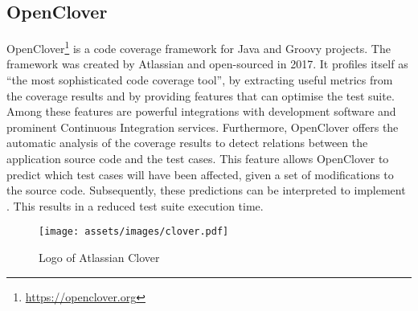 
\subsection{OpenClover}
OpenClover\footnote{\url{https://openclover.org}} is a code coverage framework for Java and Groovy projects. The framework was created by Atlassian and open-sourced in 2017. It profiles itself as ``the most sophisticated code coverage tool'', by extracting useful metrics from the coverage results and by providing features that can optimise the test suite. Among these features are powerful integrations with development software and prominent Continuous Integration services. Furthermore, OpenClover offers the automatic analysis of the coverage results to detect relations between the application source code and the test cases. This feature allows OpenClover to predict which test cases will have been affected, given a set of modifications to the source code. Subsequently, these predictions can be interpreted to implement \tcs{}. This results in a reduced test suite execution time.

\begin{figure}[htbp!]
	\centering
	\texttt{[image: assets/images/clover.pdf]}
	\caption{Logo of Atlassian Clover}
\end{figure}